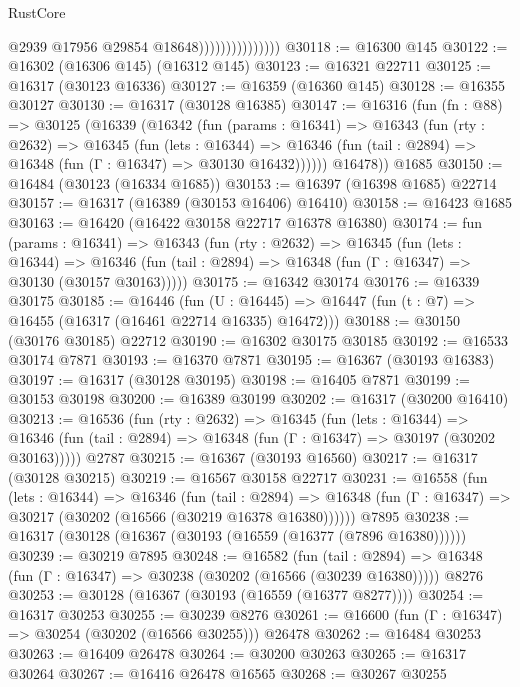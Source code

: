 \begin{lexlean}{RustCore}
\begin{coremodule}
                                  @2939
                                  @17956
                                  @29854
                                  @18648)))))))))))))))
@30118 := @16300 @145
@30122 := @16302 (@16306 @145) (@16312 @145)
@30123 := @16321 @22711
@30125 := @16317 (@30123 @16336)
@30127 := @16359 (@16360 @145)
@30128 := @16355 @30127
@30130 := @16317 (@30128 @16385)
@30147 := @16316
    (fun (fn : @88) =>
    @30125
      (@16339
        (@16342
          (fun (params : @16341) =>
          @16343
            (fun (rty : @2632) =>
            @16345
              (fun (lets : @16344) =>
              @16346 (fun (tail : @2894) => @16348 (fun (Γ : @16347) => @30130 @16432))))))
        @16478))
    @1685
@30150 := @16484 (@30123 (@16334 @1685))
@30153 := @16397 (@16398 @1685) @22714
@30157 := @16317 (@16389 (@30153 @16406) @16410)
@30158 := @16423 @1685
@30163 := @16420 (@16422 @30158 @22717 @16378 @16380)
@30174 := fun (params : @16341) =>
  @16343
    (fun (rty : @2632) =>
    @16345
      (fun (lets : @16344) =>
      @16346 (fun (tail : @2894) => @16348 (fun (Γ : @16347) => @30130 (@30157 @30163)))))
@30175 := @16342 @30174
@30176 := @16339 @30175
@30185 := @16446
    (fun (U : @16445) => @16447 (fun (t : @7) => @16455 (@16317 (@16461 @22714 @16335) @16472)))
@30188 := @30150 (@30176 @30185) @22712
@30190 := @16302 @30175 @30185
@30192 := @16533 @30174 @7871
@30193 := @16370 @7871
@30195 := @16367 (@30193 @16383)
@30197 := @16317 (@30128 @30195)
@30198 := @16405 @7871
@30199 := @30153 @30198
@30200 := @16389 @30199
@30202 := @16317 (@30200 @16410)
@30213 := @16536
    (fun (rty : @2632) =>
    @16345
      (fun (lets : @16344) =>
      @16346 (fun (tail : @2894) => @16348 (fun (Γ : @16347) => @30197 (@30202 @30163)))))
    @2787
@30215 := @16367 (@30193 @16560)
@30217 := @16317 (@30128 @30215)
@30219 := @16567 @30158 @22717
@30231 := @16558
    (fun (lets : @16344) =>
    @16346
      (fun (tail : @2894) =>
      @16348 (fun (Γ : @16347) => @30217 (@30202 (@16566 (@30219 @16378 @16380))))))
    @7895
@30238 := @16317 (@30128 (@16367 (@30193 (@16559 (@16377 (@7896 @16380))))))
@30239 := @30219 @7895
@30248 := @16582
    (fun (tail : @2894) => @16348 (fun (Γ : @16347) => @30238 (@30202 (@16566 (@30239 @16380)))))
    @8276
@30253 := @30128 (@16367 (@30193 (@16559 (@16377 @8277))))
@30254 := @16317 @30253
@30255 := @30239 @8276
@30261 := @16600 (fun (Γ : @16347) => @30254 (@30202 (@16566 @30255))) @26478
@30262 := @16484 @30253
@30263 := @16409 @26478
@30264 := @30200 @30263
@30265 := @16317 @30264
@30267 := @16416 @26478 @16565
@30268 := @30267 @30255

\end{coremodule}
\end{lexlean}
